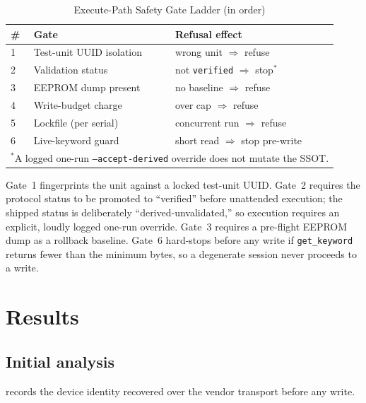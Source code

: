 \documentclass[conference]{IEEEtran}
\begin{document}
\begin{table}[ht]
\centering
\caption{Execute-Path Safety Gate Ladder (in order)}
\label{tab:gates}
\begin{tabular}{@{}lll@{}}
\toprule
\# & Gate & Refusal effect \\
\midrule
1 & Test-unit UUID isolation & wrong unit $\Rightarrow$ refuse \\
2 & Validation status        & not \texttt{verified} $\Rightarrow$ stop$^*$ \\
3 & EEPROM dump present       & no baseline $\Rightarrow$ refuse \\
4 & Write-budget charge       & over cap $\Rightarrow$ refuse \\
5 & Lockfile (per serial)     & concurrent run $\Rightarrow$ refuse \\
6 & Live-keyword guard        & short read $\Rightarrow$ stop pre-write \\
\bottomrule
\multicolumn{3}{l}{\footnotesize $^*$A logged one-run
\texttt{--accept-derived} override does not mutate the SSOT.} \\
\end{tabular}
\end{table}

Gate~1 fingerprints the unit against a locked test-unit UUID. Gate~2
requires the protocol status to be promoted to ``verified'' before
unattended execution; the shipped status is deliberately
``derived-unvalidated,'' so execution requires an explicit, loudly logged
one-run override. Gate~3 requires a pre-flight EEPROM dump as a rollback
baseline. Gate~6 hard-stops before any write if \texttt{get\_keyword}
returns fewer than the minimum bytes, so a degenerate session never
proceeds to a write.

\section{Results}
\label{sec:results}

\subsection{Initial analysis}
\label{sec:results-initial}

 records the device identity recovered over the vendor
transport before any write.
\end{document}

